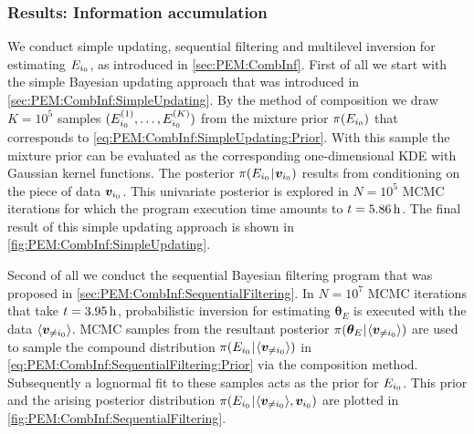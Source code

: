 \subsubsection{Results: Information accumulation}
We conduct simple updating, sequential filtering and multilevel inversion for estimating \(E_{i_0}\), as introduced in \cref{sec:PEM:CombInf}.
First of all we start with the simple Bayesian updating approach that was introduced in \cref{sec:PEM:CombInf:SimpleUpdating}.
By the method of composition we draw \(K = 10^5\) samples \((E_{i_0}^{(1)},\ldots,E_{i_0}^{(K)})\) from the mixture prior \(\pi(E_{i_0})\) that corresponds to \cref{eq:PEM:CombInf:SimpleUpdating:Prior}.
With this sample the mixture prior can be evaluated as the corresponding one-dimensional KDE with Gaussian kernel functions.
The posterior \(\pi(E_{i_0} {\:\!}|{\:\!} \bm{v}_{i_0})\) results from conditioning on the piece of data \(\bm{v}_{i_0}\).
This univariate posterior is explored in \(N=10^5\) MCMC iterations for which the program execution time amounts to \(t=\unit[5.86]{h}\).
The final result of this simple updating approach is shown in \cref{fig:PEM:CombInf:SimpleUpdating}.
\par %
Second of all we conduct the sequential Bayesian filtering program that was proposed in \cref{sec:PEM:CombInf:SequentialFiltering}.
In \(N=10^7\) MCMC iterations that take \(t=\unit[3.95]{h}\), probabilistic inversion for estimating \(\bm{\theta}_E\) is executed with the data \(\langle{\bm{v}_{\neq i_0}}\rangle\).
MCMC samples from the resultant posterior \(\pi(\bm{\theta}_E {\:\!}|{\:\!} \langle{\bm{v}_{\neq i_0}}\rangle)\) are used to sample the compound distribution
\(\pi(E_{i_0} {\:\!}|{\:\!} \langle{\bm{v}_{\neq i_0}}\rangle)\) in \cref{eq:PEM:CombInf:SequentialFiltering:Prior} via the composition method.
Subsequently a lognormal fit to these samples acts as the prior for \(E_{i_0}\).
This prior and the arising posterior distribution \(\pi(E_{i_0} {\:\!}|{\:\!} \langle{\bm{v}_{\neq i_0}}\rangle,\bm{v}_{i_0})\) are plotted in \cref{fig:PEM:CombInf:SequentialFiltering}.
